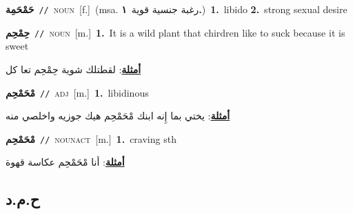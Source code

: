 \documentclass[10pt,a4paper,twoside]{article} %
\begin{document}
\begin{multicols}{2}
{\setlength\topsep{0pt}\textbf{\foreignlanguage{arabic}{حَمْحَمِة}}\ {\color{gray}\texttt{//}\color{black}}\ \textsc{noun}\ [f.]\ \color{gray}(msa. \foreignlanguage{arabic}{رغبة جنسية قوية}~\foreignlanguage{arabic}{\textbf{١.}})\color{black}\ \textbf{1.}~libido  \textbf{2.}~strong sexual desire\ } \vspace{2mm}

{\setlength\topsep{0pt}\textbf{\foreignlanguage{arabic}{حِمْحِم}}\ {\color{gray}\texttt{//}\color{black}}\ \textsc{noun}\ [m.]\ \textbf{1.}~It is a wild plant that chirdren like to suck because it is sweet\  \begin{flushright}\color{gray}\foreignlanguage{arabic}{\textbf{\underline{\foreignlanguage{arabic}{أمثلة}}}: لقطتلك شوية حِمْحِم تعا كل}\end{flushright}\color{black}} \vspace{2mm}

{\setlength\topsep{0pt}\textbf{\foreignlanguage{arabic}{مْحَمْحِم}}\ {\color{gray}\texttt{//}\color{black}}\ \textsc{adj}\ [m.]\ \textbf{1.}~libidinous\  \begin{flushright}\color{gray}\foreignlanguage{arabic}{\textbf{\underline{\foreignlanguage{arabic}{أمثلة}}}: يختي بما إِنه ابنك مْحَمْحِم هيك جوزيه واخلصي منه}\end{flushright}\color{black}} \vspace{2mm}

{\setlength\topsep{0pt}\textbf{\foreignlanguage{arabic}{مْحَمْحِم}}\ {\color{gray}\texttt{//}\color{black}}\ \textsc{noun\textunderscore act}\ [m.]\ \textbf{1.}~craving sth\  \begin{flushright}\color{gray}\foreignlanguage{arabic}{\textbf{\underline{\foreignlanguage{arabic}{أمثلة}}}: أنا مْحَمْحِم عكاسة قهوة}\end{flushright}\color{black}} \vspace{2mm}

\vspace{-3mm}
\subsection*{\color{blue}\foreignlanguage{arabic}{ح.م.د}\color{blue}{}} 


\end{multicols}
\end{document}
